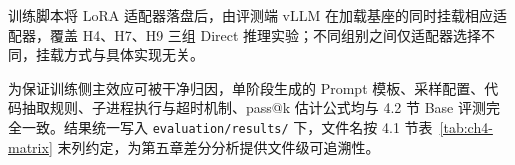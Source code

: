 
训练脚本将 LoRA 适配器落盘后，由评测端 vLLM 在加载基座的同时挂载相应适配器，覆盖 H4、H7、H9 三组 Direct 推理实验；不同组别之间仅适配器选择不同，挂载方式与具体实现无关。

为保证训练侧主效应可被干净归因，单阶段生成的 Prompt 模板、采样配置、代码抽取规则、子进程执行与超时机制、pass@k 估计公式均与 4.2 节 Base 评测完全一致。结果统一写入 \texttt{evaluation/results/} 下，文件名按 4.1 节表~\ref{tab:ch4-matrix} 末列约定，为第五章差分分析提供文件级可追溯性。
